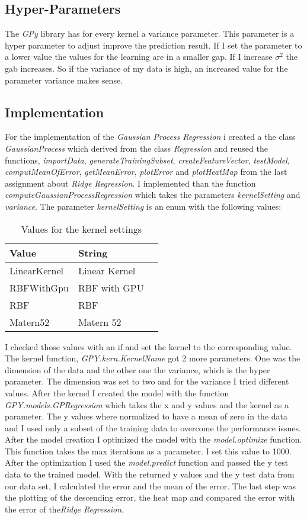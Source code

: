 \documentclass[10pt, a4paper, twocolumn]{article} %
\begin{document}
\subsection{Hyper-Parameters}
The \textit{GPy} library has for every kernel a variance parameter. This parameter is a hyper parameter to adjust improve the prediction result. If I set the parameter to a lower value the values for the learning are in a smaller gap. If I increase $\sigma^2$ the gab increases. So if the variance of my data is high, an increased value for the parameter variance makes sense.

\subsection{Implementation}
For the implementation of the \textit{Gaussian Process Regression} i created a the class \textit{GaussianProcess} which derived from the class \textit{Regression} and reused the functions, \textit{importData}, \textit{generateTrainingSubset}, \textit{createFeatureVector}, \textit{testModel}, \textit{computMeanOfError}, \textit{getMeanError}, \textit{plotError} and \textit{plotHeatMap} from the last assignment about \textit{Ridge Regression}. I implemented than the function \textit{computeGaussianProcessRegression} which takes the parameters \textit{kernelSetting} and \textit{variance}. The parameter \textit{kernelSetting} is an enum with the following values: 
\begin{table}[htbp]
    \label{tab:kernelSettings}
	\caption{Values for the kernel settings}
	\centering
	\begin{tabular}{llr}
		\cmidrule(r){1-2}
		Value & String \\
		\midrule
		LinearKernel & Linear Kernel \\
		RBFWithGpu & RBF with GPU \\
		RBF & RBF \\				
		Matern52 & Matern 52 \\
		\bottomrule
	\end{tabular}
\end{table}

I checked those values with an if and set the kernel to the corresponding value.
The kernel function, \textit{GPY.kern.KernelName} got 2 more parameters. One was the dimension of the data and the other one the variance, which is the hyper parameter. The dimension was set to two and for the variance I tried different values. After the kernel I created the model with the function \textit{GPY.models.GPRegression} which takes the x and y values and the kernel as a parameter. The y values where normalized to have a mean of zero in the data and I used only a subset of the training data to overcome the performance issues. After the model creation I optimized the model with the \textit{model.optimize} function. This function takes the max iterations as a parameter. I set this value to 1000. After the optimization I used the \textit{model.predict} function and passed the y test data to the trained model. With the returned y values and the y test data from our data set, I calculated the error and the mean of the error. The last step was the plotting of the descending error, the heat map and compared the error with the error of the\textit{Ridge Regression}.
\end{document}
